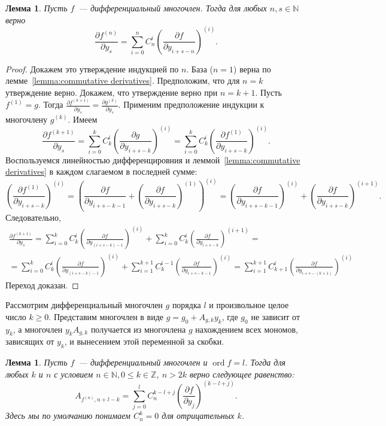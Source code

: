 \documentclass[16pt]{article}
\DeclareMathOperator{\ord}{ord}
\renewcommand{\le}{\leqslant} %
\renewcommand{\ge}{\geqslant} %
\theoremstyle{plain1}
\newtheorem{lemma}[theorem1]{Лемма}
\theoremstyle{plain2}
\theoremstyle{plain}
\theoremstyle{plain3}
\theoremstyle{definition}
\theoremstyle{remark}
\begin{document}
\begin{lemma}\label{lemma:f^(n)}
Пусть $f$~--- дифференциальный многочлен. Тогда для любых $n, s \in\mathbb{N}$ верно
$$
\frac{\partial f^{(n)}}{\partial y_s} = \sum\limits_{i=0}^n  C_n^i  \left(\frac{\partial f}{\partial y_{i+s-n}}\right)^{(i)}.
$$
\end{lemma}
\begin{proof}
Докажем это утверждение индукцией по $n$.  База ($n=1$) верна по лемме~\ref{lemma:commutative derivatives}. Предположим, что для $n=k$ утверждение верно.
Докажем, что утверждение верно при $n=k+1$. Пусть $f^{(1)}=g$. Тогда
$\frac{\partial f^{(k+1)}}{\partial y_s} = \frac{\partial g^{(k)}}{\partial y_s}$.
Применим предположение индукции к многочлену $g^{(k)}$. Имеем 
$$
\frac{\partial f^{(k+1)}}{\partial y_s} =  \sum\limits_{i=0}^k  C_k^i  \left(\frac{\partial g}{\partial y_{i+s-k}}\right)^{(i)}=\sum\limits_{i=0}^k  C_k^i  \left(\frac{\partial f^{(1)}}{\partial y_{i+s-k}}\right)^{(i)}. 
$$
Воспользуемся линейностью дифференцировния и леммой~\ref{lemma:commutative derivatives} в каждом слагаемом в последней сумме:  
$$
\left(\frac{\partial f^{(1)}}{\partial y_{i+s-k}}\right)^{(i)}= \left(\frac{\partial f}{\partial y_{i+s-k-1}}+\left(\frac{\partial f}{\partial y_{i+s-k}}\right)^{(1)}\right)^{(i)}=\left(\frac{\partial f}{\partial y_{i+s-k-1}}\right)^{(i)}+\left(\frac{\partial f}{\partial y_{i+s-k}}\right)^{(i+1)}.
$$ 
Следовательно,
\begin{gather*}
\frac{\partial f^{(k+1)}}{\partial y_s}=\sum\limits_{i=0}^k  C_k^i\left(\frac{\partial f}{\partial y_{(i+s-k)-1}}\right)^{(i)}+\sum\limits_{i=0}^k  C_k^i\left(\frac{\partial f}{\partial y_{i+s-k}}\right)^{(i+1)} = \\
= \sum\limits_{i=0}^k  C_k^i\left(\frac{\partial f}{\partial y_{(i+s-k)-1}}\right)^{(i)}+\sum\limits_{i=1}^{k+1}  C_k^{i-1}\left(\frac{\partial f}{\partial y_{i+s-k-1}}\right)^{(i)}=\sum\limits_{i=1}^{k+1} C_{k+1}^{i}\left(\frac{\partial f}{\partial y_{i+s-(k+1)}}\right)^{(i)}
\end{gather*}
Переход доказан.
\end{proof}
Рассмотрим дифференциальный многочлен $g$ порядка $l$ и произвольное
целое число $k\ge0$. Представим многочлен в виде $g=g_0+A_{g,k}y_k$, где
$g_0$ не зависит от $y_k$, а многочлен $y_kA_{g,k}$ получается из
многочлена $g$ нахождением всех мономов, зависящих от $y_k$, и
вынесением этой переменной за скобки.
\begin{lemma}\label{lemma:A_fn}
Пусть $f$~--- дифференциальный многочлен и $\ord f = l$.
Тогда для любых $k$ и $n$ с условием  $n\in\mathbb{N},0\le k\in\mathbb{Z}$, $n>2k$ верно следующее
равенство:
$$
A_{f^{(n)}, n+l-k}=\sum\limits_{j=0}^{l}C_n^{k - l + j
}\left(\frac{\partial f}{\partial y_j}\right)^{(k - l + j)}.
$$
Здесь мы по умолчанию понимаем $C_n^{k}=0$ для отрицательных
$k$.
\end{lemma}
\end{document}
